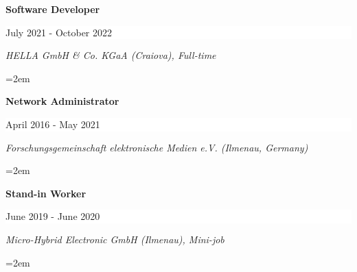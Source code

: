 \documentclass[paper=a4,fontsize=10.9pt]{scrartcl} %
\newcommand{\sepspace}{\vspace*{0.5em}}		%
\newcommand{\EducationEntry}[4]{
		\noindent \textbf{#1} \hfill      %
		\colorbox{White}{%
			\parbox{16em}{%
			\hfill\color{Black}#2}} \par  %
		\noindent \textit{#3} \par        %
		\noindent\hangindent=2em\hangafter=0 \small #4 %
		\normalsize \par}
\begin{document}
\EducationEntry{\color[HTML]{6a040f}Software Developer}{July 2021 - October 2022}{HELLA GmbH \& Co. KGaA (Craiova), Full-time}{%
%
%
}

\EducationEntry{\color[HTML]{6a040f}Network Administrator}{April 2016 - May 2021}{Forschungsgemeinschaft elektronische Medien e.V. (Ilmenau, Germany)}{}
\EducationEntry{\color[HTML]{6a040f}Stand-in Worker}{June 2019 - June 2020}{Micro-Hybrid Electronic GmbH (Ilmenau), Mini-job}{%
%
%	
}
\end{document}
